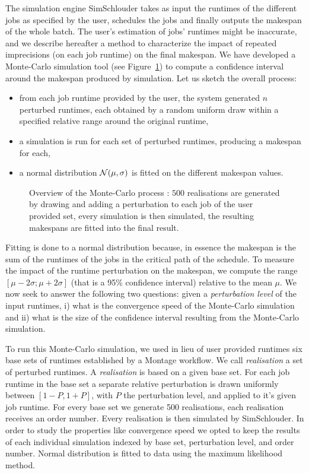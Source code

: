 \documentclass[10pt,conference,compsocconf]{IEEEtran}
\begin{document}
The simulation engine SimSchlouder takes as  input the runtimes of the different
jobs  as specified  by the  user,  schedules the  jobs and  finally outputs  the
makespan of  the whole batch. The  user's estimation of jobs'  runtimes might be
inaccurate, and  we describe hereafter  a method  to characterize the  impact of
repeated  imprecisions (on  each job  runtime) on  the final  makespan. We  have
developed  a Monte-Carlo  simulation  tool  (see Figure~\ref{fig:mcprocess})  to
compute a confidence interval around the makespan produced by simulation. Let us
sketch the overall process:
\begin{itemize} 
	\item  from each  job runtime  provided by  the user,  the system
		generated $n$ perturbed runtimes, each obtained by a  random
		uniform draw within a specified relative range around the
		original runtime,
	\item a simulation  is run for each set of  perturbed runtimes,
		producing a makespan for each, 
	\item  a  normal  distribution  ${\cal N}(\mu,\sigma)$  is  fitted  on
		the different  makespan values.
\end{itemize}
\begin{figure}
	\centering
	\resizebox{0.5\textwidth}{!}{%
		
		}
	\caption{Overview of the Monte-Carlo process : $500$ realisations are
	generated by drawing and adding a perturbation to each job of the
	user provided set, every simulation is then simulated, the resulting
	makespans are fitted into the final result. \label{fig:mcprocess}}
\end{figure}
Fitting is done to a normal distribution because, in essence the makespan is the
sum  of the  runtimes of  the jobs  in the  critical path  of the  schedule.  To
measure the impact  of the runtime perturbation on the  makespan, we compute the
range $[\mu-2\sigma;\mu+2\sigma]$ (that is  a 95\% confidence interval) relative
to  the mean  $\mu$. 
We now  seek to answer the  following two questions: given  a \emph{perturbation
  level}  of  the input  runtimes,  i)  what is  the  convergence  speed of  the
Monte-Carlo  simulation and  ii) what  is the  size of  the confidence  interval
resulting from the Monte-Carlo simulation.

To run  this Monte-Carlo simulation, we  used in lieu of  user provided runtimes
six base sets  of runtimes established by  a Montage\cite{montage2009} workflow.
We call \emph{realisation} a set  of perturbed runtimes. A \emph{realisation} is
based on  a given  base set. For  each job  runtime in the  base set  a separate
relative  perturbation is  drawn  uniformly between  $[1-P,1+P]$,  with $P$  the
perturbation level, and applied to it's given job runtime. For every base set we
generate  500 realisations,  each realisation  receives an  order number.   Every
realisation is then simulated by SimSchlouder.  In order to study the properties
like  convergence  speed  we  opted  to keep  the  results  of  each  individual
simulation indexed  by base set,  perturbation level, and order  number.  Normal
distribution is fitted to data using the maximum likelihood method.
\end{document}
